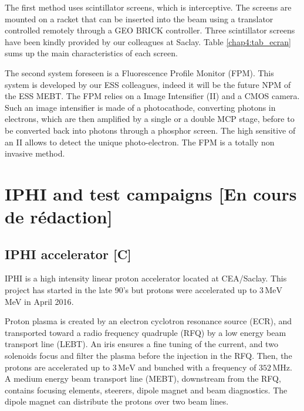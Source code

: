 \begin{refsection}
  The first method uses scintillator screens, which is interceptive. The screens are mounted on a racket that can be inserted into the beam using a translator controlled remotely through a GEO BRICK controller. Three scintillator screens have been kindly provided by our colleagues at Saclay. Table \ref{chap4:tab_ecran} sums up the main characteristics of each screen.

  

  The second system foreseen is a Fluorescence Profile Monitor (FPM). This system is developed by our ESS colleagues, indeed it will be the future NPM of the ESS MEBT. The FPM relies on a Image Intensifier (II) and a CMOS camera.
  Such an image intensifier is made of a photocathode, converting photons in electrons, which are then amplified by a single or a double MCP stage, before to be converted back into photons through a phosphor screen. The high sensitive of an II allows to detect the unique photo-electron. The FPM is a totally non invasive method.



  \section{IPHI and test campaigns [En cours de rédaction]}
  \subsection{IPHI accelerator [C]}
  IPHI is a high intensity linear proton accelerator located at CEA/Saclay.
  This project has started in the late 90's\cite{Beau2000} but protons were accelerated up to $3\,\mathrm{MeV}$ MeV in April 2016\cite{Gobin2016}.

  Proton plasma is created by an electron cyclotron resonance source (ECR), and transported toward a radio frequency quadruple (RFQ) by a low energy beam transport line (LEBT).
  An iris ensures a fine tuning of the current, and two solenoids focus and filter the plasma before the injection in the RFQ.
  Then, the protons are accelerated up to $3\,\mathrm{MeV}$ and bunched with a frequency of $352\,\mathrm{MHz}$.
  A medium energy beam transport line (MEBT), downstream from the RFQ, contains focusing elements, steerers, dipole magnet and beam diagnostics.
  The dipole magnet can distribute the protons over two beam lines.


\end{refsection}
